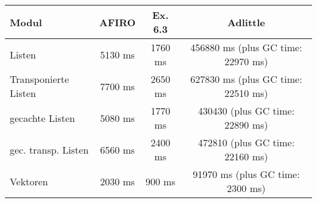 \documentclass[a4paper]{article}
\begin{document}
\begin{tabular}{lccc}
Modul & AFIRO & Ex. 6.3 & Adlittle \\
\hline
Listen & 5130 ms & 1760 ms & 456880 ms (plus GC time: 22970 ms)  \\
Transponierte Listen & 7700 ms & 2650 ms & 627830 ms (plus GC time: 22510 ms)\\
gecachte Listen & 5080 ms & 1770 ms & 430430 (plus GC time: 22890 ms) \\
gec. transp. Listen & 6560 ms & 2400 ms & 472810 (plus GC time: 22160 ms)  \\
Vektoren & 2030 ms & 900 ms & 91970 ms (plus GC time: 2300 ms)  \\
\end{tabular}
\\
\\
\end{document}

